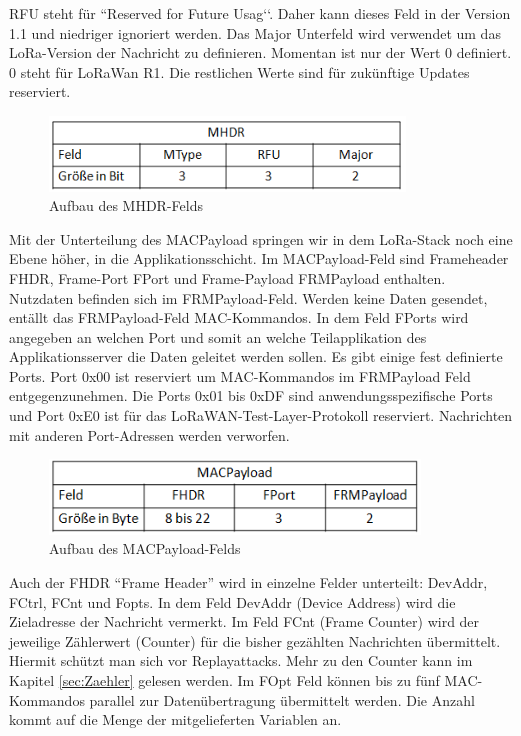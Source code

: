 \documentclass[a4paper, 12pt]{article}
\begin{document}
                RFU steht für ``Reserved for Future Usag‘‘. Daher kann 
                dieses Feld in der Version 1.1 und niedriger ignoriert werden. Das Major Unterfeld wird verwendet um das 
                LoRa-Version der Nachricht zu definieren. Momentan ist nur der Wert 0 definiert. 0 steht für LoRaWan R1. 
                Die restlichen Werte sind für zukünftige Updates reserviert.

                \begin{figure}[ht]
                    \centering
                    \includegraphics[height=2cm]{MHDR}
                    \caption{Aufbau des MHDR-Felds}
                \end{figure}

                Mit der Unterteilung des MACPayload springen wir in dem LoRa-Stack noch eine Ebene höher, in die 
                Applikationsschicht. Im MACPayload-Feld sind Frameheader FHDR, Frame-Port FPort und 
                Frame-Payload FRMPayload enthalten. Nutzdaten befinden sich im FRMPayload-Feld. Werden keine
                Daten gesendet, entällt das FRMPayload-Feld MAC-Kommandos. In dem Feld FPorts wird 
                angegeben an welchen Port und somit an welche Teilapplikation des Applikationsserver die Daten geleitet 
                werden sollen. Es gibt einige fest definierte Ports. Port 0x00 ist reserviert um MAC-Kommandos im FRMPayload Feld 
                entgegenzunehmen. Die Ports 0x01 bis 0xDF sind anwendungsspezifische Ports und Port 0xE0 ist für das 
                LoRaWAN-Test-Layer-Protokoll reserviert. Nachrichten mit anderen Port-Adressen werden verworfen. 
                
                \begin{figure}[ht]
                    \centering
                    \includegraphics[height=2cm]{MACPayload}
                    \caption{Aufbau des MACPayload-Felds}
                \end{figure}

                Auch der FHDR ``Frame Header'' wird in einzelne Felder unterteilt: DevAddr, FCtrl, FCnt und Fopts. 
                In dem Feld DevAddr (Device Address) wird die Zieladresse der Nachricht vermerkt. Im Feld FCnt 
                (Frame Counter) wird der 
                jeweilige Zählerwert (Counter) für die bisher gezählten Nachrichten übermittelt. Hiermit schützt man sich vor 
                Replayattacks. Mehr zu den Counter kann im Kapitel \ref{sec:Zaehler}  gelesen werden. Im FOpt Feld 
                können bis zu fünf MAC-Kommandos parallel zur Datenübertragung übermittelt werden. Die Anzahl kommt auf die Menge der 
                mitgelieferten Variablen an. 
\end{document}
